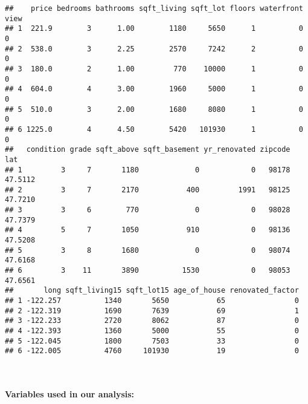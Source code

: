 \documentclass[
]{article}
\begin{document}
\begin{verbatim}
##    price bedrooms bathrooms sqft_living sqft_lot floors waterfront view
## 1  221.9        3      1.00        1180     5650      1          0    0
## 2  538.0        3      2.25        2570     7242      2          0    0
## 3  180.0        2      1.00         770    10000      1          0    0
## 4  604.0        4      3.00        1960     5000      1          0    0
## 5  510.0        3      2.00        1680     8080      1          0    0
## 6 1225.0        4      4.50        5420   101930      1          0    0
##   condition grade sqft_above sqft_basement yr_renovated zipcode     lat
## 1         3     7       1180             0            0   98178 47.5112
## 2         3     7       2170           400         1991   98125 47.7210
## 3         3     6        770             0            0   98028 47.7379
## 4         5     7       1050           910            0   98136 47.5208
## 5         3     8       1680             0            0   98074 47.6168
## 6         3    11       3890          1530            0   98053 47.6561
##       long sqft_living15 sqft_lot15 age_of_house renovated_factor
## 1 -122.257          1340       5650           65                0
## 2 -122.319          1690       7639           69                1
## 3 -122.233          2720       8062           87                0
## 4 -122.393          1360       5000           55                0
## 5 -122.045          1800       7503           33                0
## 6 -122.005          4760     101930           19                0
\end{verbatim}

~

\hypertarget{variables-used-in-our-analysis}{%
\paragraph{Variables used in our
analysis:}\label{variables-used-in-our-analysis}}
\end{document}
